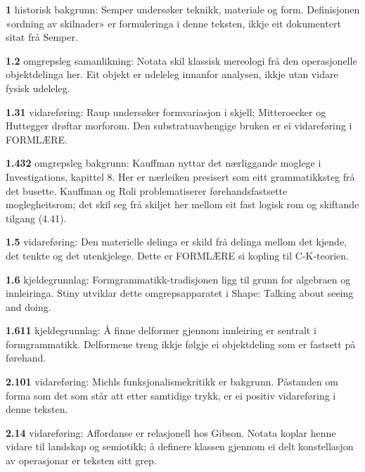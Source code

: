 \begin{widebody}
\noindent\hypertarget{kjeldenotat-1}{}\textbf{1} historisk bakgrunn: Semper undersøker teknikk, materiale og form. Definisjonen «ordning av skilnader» er formuleringa i denne teksten, ikkje eit dokumentert sitat frå Semper.\par\medskip
\noindent\hypertarget{kjeldenotat-1.2}{}\textbf{1.2} omgrepsleg samanlikning: Notata skil klassisk mereologi frå den operasjonelle objektdelinga her. Eit objekt er udeleleg innanfor analysen, ikkje utan vidare fysisk udeleleg.\par\medskip
\noindent\hypertarget{kjeldenotat-1.31}{}\textbf{1.31} vidareføring: Raup undersøker formvariasjon i skjell; Mitteroecker og Huttegger drøftar morforom. Den substratuavhengige bruken er ei vidareføring i FORMLÆRE.\par\medskip
\noindent\hypertarget{kjeldenotat-1.432}{}\textbf{1.432} omgrepsleg bakgrunn: Kauffman nyttar det nærliggande moglege i Investigations, kapittel 8. Her er nærleiken presisert som eitt grammatikksteg frå det busette. Kauffman og Roli problematiserer førehandsfastsette moglegheitsrom; det skil seg frå skiljet her mellom eit fast logisk rom og skiftande tilgang (4.41).\par\medskip
\noindent\hypertarget{kjeldenotat-1.5}{}\textbf{1.5} vidareføring: Den materielle delinga er skild frå delinga mellom det kjende, det tenkte og det utenkjelege. Dette er FORMLÆRE si kopling til C-K-teorien.\par\medskip
\noindent\hypertarget{kjeldenotat-1.6}{}\textbf{1.6} kjeldegrunnlag: Formgrammatikk-tradisjonen ligg til grunn for algebraen og innleiringa. Stiny utviklar dette omgrepsapparatet i Shape: Talking about seeing and doing.\par\medskip
\noindent\hypertarget{kjeldenotat-1.611}{}\textbf{1.611} kjeldegrunnlag: Å finne delformer gjennom innleiring er sentralt i formgrammatikk. Delformene treng ikkje følgje ei objektdeling som er fastsett på førehand.\par\medskip
\noindent\hypertarget{kjeldenotat-2.101}{}\textbf{2.101} vidareføring: Michls funksjonalismekritikk er bakgrunn. Påstanden om forma som det som står att etter samtidige trykk, er ei positiv vidareføring i denne teksten.\par\medskip
\noindent\hypertarget{kjeldenotat-2.14}{}\textbf{2.14} vidareføring: Affordanse er relasjonell hos Gibson. Notata koplar henne vidare til landskap og semiotikk; å definere klassen gjennom ei delt konstellasjon av operasjonar er teksten sitt grep.\par\medskip

\end{widebody}
